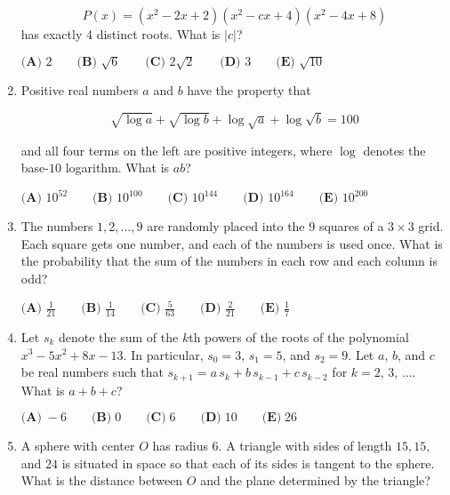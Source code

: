 \documentclass{article}
\begin{document}
\begin{enumerate}[label=\arabic*., itemsep=0.5em]
\begin{equation*}
P(x) = (x^2 - 2x + 2)(x^2 - cx + 4)(x^2 - 4x + 8)
\end{equation*}
has exactly 4 distinct roots. What is $|c|$?

$\textbf{(A) } 2 \qquad \textbf{(B) } \sqrt{6} \qquad \textbf{(C) } 2\sqrt{2} \qquad \textbf{(D) } 3 \qquad \textbf{(E) } \sqrt{10}$\par \vspace{0.5em}\item Positive real numbers $a$ and $b$ have the property that

\begin{equation*}
\sqrt{\log{a}} + \sqrt{\log{b}} + \log \sqrt{a} + \log \sqrt{b} = 100
\end{equation*}


and all four terms on the left are positive integers, where $\log$ denotes the base-$10$ logarithm. What is $ab$?

$\textbf{(A) }   10^{52}   \qquad        \textbf{(B) }   10^{100}   \qquad    \textbf{(C) }   10^{144}   \qquad   \textbf{(D) }  10^{164} \qquad  \textbf{(E) }   10^{200} $\par \vspace{0.5em}\item The numbers $1,2,\dots,9$ are randomly placed into the $9$ squares of a $3 \times 3$ grid. Each square gets one number, and each of the numbers is used once. What is the probability that the sum of the numbers in each row and each column is odd?

$\textbf{(A) }\frac{1}{21}\qquad\textbf{(B) }\frac{1}{14}\qquad\textbf{(C) }\frac{5}{63}\qquad\textbf{(D) }\frac{2}{21}\qquad\textbf{(E) } \frac17$\par \vspace{0.5em}\item Let $s_k$ denote the sum of the $\textit{k}$th powers of the roots of the polynomial $x^3-5x^2+8x-13$. In particular, $s_0=3$, $s_1=5$, and $s_2=9$. Let $a$, $b$, and $c$ be real numbers such that $s_{k+1} = a \, s_k + b \, s_{k-1} + c \, s_{k-2}$ for $k = 2$, $3$, $....$ What is $a+b+c$?

$\textbf{(A)} \; -6 \qquad \textbf{(B)} \; 0 \qquad \textbf{(C)} \; 6 \qquad \textbf{(D)} \; 10 \qquad \textbf{(E)} \; 26$\par \vspace{0.5em}\item A sphere with center $O$ has radius $6$. A triangle with sides of length $15, 15,$ and $24$ is situated in space so that each of its sides is tangent to the sphere. What is the distance between $O$ and the plane determined by the triangle?


\end{enumerate}
\end{document}
